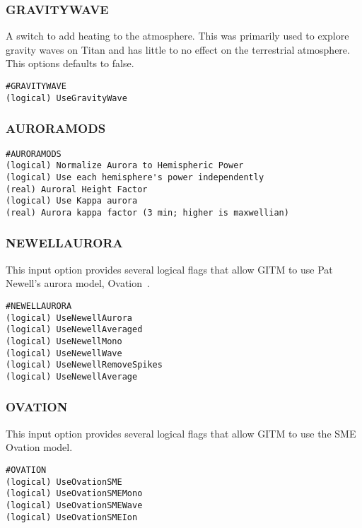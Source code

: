 \subsubsection{GRAVITYWAVE}
\label{gravitywave.sec}
A switch to add heating to the atmosphere.  This was primarily used to explore gravity waves on Titan and has little to no effect on the terrestrial atmosphere.  This options defaults to false.

\begin{verbatim}
#GRAVITYWAVE
(logical) UseGravityWave
\end{verbatim}

\subsubsection{AURORAMODS}
\label{auroramods.sec}

\begin{verbatim}
#AURORAMODS
(logical) Normalize Aurora to Hemispheric Power
(logical) Use each hemisphere's power independently
(real) Auroral Height Factor
(logical) Use Kappa aurora
(real) Aurora kappa factor (3 min; higher is maxwellian)
\end{verbatim}

\subsubsection{NEWELLAURORA}
\label{newellaurora.sec}

This input option provides several logical flags that allow GITM to use Pat Newell's aurora model, Ovation~\citep{Newell:2002ov}.

\begin{verbatim}
#NEWELLAURORA
(logical) UseNewellAurora   
(logical) UseNewellAveraged 
(logical) UseNewellMono 
(logical) UseNewellWave
(logical) UseNewellRemoveSpikes 
(logical) UseNewellAverage  
\end{verbatim}

\subsubsection{OVATION}
\label{ovation.sec}

This input option provides several logical flags that allow GITM to use the SME Ovation model.

\begin{verbatim}
#OVATION
(logical) UseOvationSME   
(logical) UseOvationSMEMono
(logical) UseOvationSMEWave
(logical) UseOvationSMEIon
\end{verbatim}

